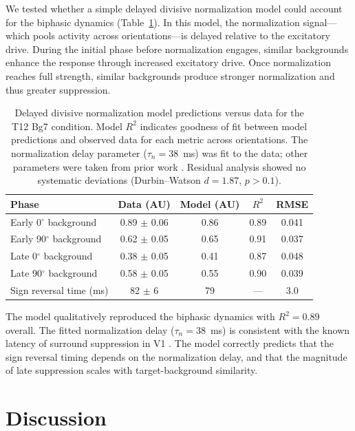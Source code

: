 \documentclass[11pt]{article}
\begin{document}
We tested whether a simple delayed divisive normalization model \citep{carandini2012, heeger1992} could account for the biphasic dynamics (Table~\ref{tab:norm_model}). In this model, the normalization signal---which pools activity across orientations---is delayed relative to the excitatory drive. During the initial phase before normalization engages, similar backgrounds enhance the response through increased excitatory drive. Once normalization reaches full strength, similar backgrounds produce stronger normalization and thus greater suppression.

\begin{table}[H]
\centering
\caption{Delayed divisive normalization model predictions versus data for the T12 Bg7 condition. Model $R^2$ indicates goodness of fit between model predictions and observed data for each metric across orientations. The normalization delay parameter ($\tau_n = 38$~ms) was fit to the data; other parameters were taken from prior work \citep{sit2009}. Residual analysis showed no systematic deviations (Durbin--Watson $d = 1.87$, $p > 0.1$).}
\label{tab:norm_model}
\begin{tabular}{lcccc}
\toprule
\textbf{Phase} & \textbf{Data (AU)} & \textbf{Model (AU)} & \textbf{$R^2$} & \textbf{RMSE} \\
\midrule
Early 0$^\circ$ background & 0.89 $\pm$ 0.06 & 0.86 & 0.89 & 0.041 \\
Early 90$^\circ$ background & 0.62 $\pm$ 0.05 & 0.65 & 0.91 & 0.037 \\
Late 0$^\circ$ background & 0.38 $\pm$ 0.05 & 0.41 & 0.87 & 0.048 \\
Late 90$^\circ$ background & 0.58 $\pm$ 0.05 & 0.55 & 0.90 & 0.039 \\
Sign reversal time (ms) & 82 $\pm$ 6 & 79 & --- & 3.0 \\
\bottomrule
\end{tabular}
\end{table}

The model qualitatively reproduced the biphasic dynamics with $R^2 = 0.89$ overall. The fitted normalization delay ($\tau_n = 38$~ms) is consistent with the known latency of surround suppression in V1 \citep{smith2006, cavanaugh2002}. The model correctly predicts that the sign reversal timing depends on the normalization delay, and that the magnitude of late suppression scales with target-background similarity.

\section{Discussion}
\end{document}
